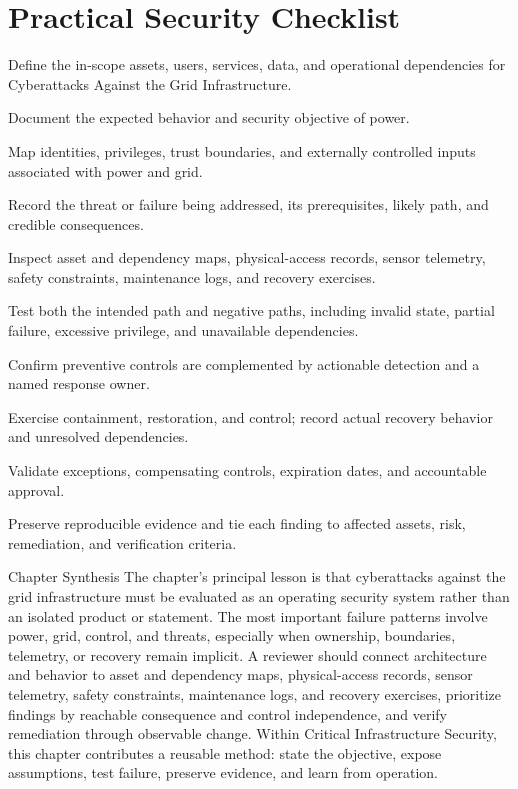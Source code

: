 \documentclass[11pt,letterpaper]{article}
\begin{document}
\section*{Practical Security Checklist}
\begin{CornellChecklist}
\item Define the in-scope assets, users, services, data, and operational dependencies for Cyberattacks Against the Grid Infrastructure.
\item Document the expected behavior and security objective of power.
\item Map identities, privileges, trust boundaries, and externally controlled inputs associated with power and grid.
\item Record the threat or failure being addressed, its prerequisites, likely path, and credible consequences.
\item Inspect asset and dependency maps, physical-access records, sensor telemetry, safety constraints, maintenance logs, and recovery exercises.
\item Test both the intended path and negative paths, including invalid state, partial failure, excessive privilege, and unavailable dependencies.
\item Confirm preventive controls are complemented by actionable detection and a named response owner.
\item Exercise containment, restoration, and control; record actual recovery behavior and unresolved dependencies.
\item Validate exceptions, compensating controls, expiration dates, and accountable approval.
\item Preserve reproducible evidence and tie each finding to affected assets, risk, remediation, and verification criteria.
\end{CornellChecklist}
\begin{CornellSummaryBox}{Chapter Synthesis}
The chapter's principal lesson is that cyberattacks against the grid infrastructure must be evaluated as an operating security system rather than an isolated product or statement. The most important failure patterns involve power, grid, control, and threats, especially when ownership, boundaries, telemetry, or recovery remain implicit. A reviewer should connect architecture and behavior to asset and dependency maps, physical-access records, sensor telemetry, safety constraints, maintenance logs, and recovery exercises, prioritize findings by reachable consequence and control independence, and verify remediation through observable change. Within Critical Infrastructure Security, this chapter contributes a reusable method: state the objective, expose assumptions, test failure, preserve evidence, and learn from operation.
\end{CornellSummaryBox}
\end{document}
